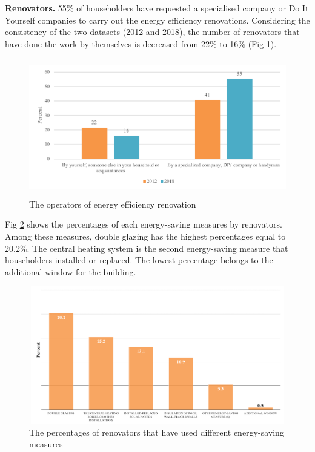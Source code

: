 \documentclass[preprint,12pt,3p]{elsarticle}
\begin{document}
\noindent
\textbf{Renovators.} 55\% of householders have requested a specialised company or Do It Yourself companies to carry out the energy efficiency renovations. Considering the consistency of the two datasets (2012 and 2018), the number of renovators that have done the work by themselves is decreased from 22\% to 16\% (Fig \ref{fig:6}). 

\begin{figure}[H]
    \centering
    \includegraphics[width=12cm, height=6cm, clip, trim=4 4 4 4, clip]{donethework.PNG}
    \caption{The operators of energy efficiency renovation}
    \label{fig:6}
\end{figure}

Fig \ref{fig:7} shows the percentages of each energy-saving measures by renovators. Among these measures, double glazing has the highest percentages equal to 20.2\%. The central heating system is the second energy-saving measure that householders installed or replaced. The lowest percentage belongs to the additional window for the building.

\begin{figure}[H]
    \centering
    \includegraphics[width=12cm, height=6cm, clip, trim=4 4 4 25, clip]{ESMs.PNG}
    \caption{The percentages of renovators that have used different energy-saving measures}
    \label{fig:7}
\end{figure}
\end{document}
